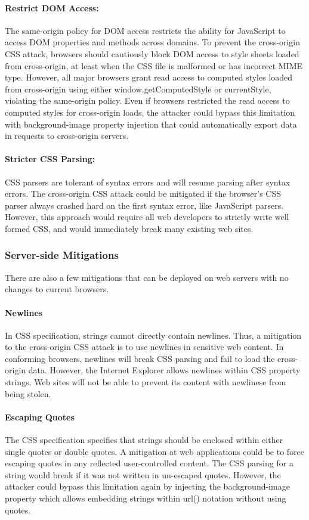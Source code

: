 \documentclass{acm_proc_article-sp}
\begin{document}
{\paragraph{Restrict DOM Access:}
The same-origin policy for DOM access restricts the ability for JavaScript to access DOM properties and methods across domains. To prevent the cross-origin CSS attack, browsers should cautiously block DOM access to style sheets loaded from cross-origin, at least when the CSS file is malformed or has incorrect MIME type. However, all major browsers grant read access to computed styles loaded from cross-origin using either window.getComputedStyle or currentStyle, violating the same-origin policy. Even if browsers restricted the read access to computed styles for cross-origin loads, the attacker could bypass this limitation with background-image property injection that could automatically export data in requests to cross-origin servers.

\paragraph{Stricter CSS Parsing:}
CSS parsers are tolerant of syntax errors and will resume parsing after syntax errors. The cross-origin CSS attack could be mitigated if the browser's CSS parser always crashed hard on the first syntax error, like JavaScript parsers. However, this approach would require all web developers to strictly write well formed CSS, and would immediately break many existing web sites.

\subsubsection{Server-side Mitigations}
There are also a few mitigations that can be deployed on web servers with no changes to current browsers.

\paragraph{Newlines}
In CSS specification, strings cannot directly contain newlines. Thus, a mitigation to the cross-origin CSS attack is to use newlines in sensitive web content. In conforming browsers, newlines will break CSS parsing and fail to load the cross-origin data. However, the Internet Explorer allows newlines within CSS property strings. Web sites will not be able to prevent its content with newlinese from being stolen.

\paragraph{Escaping Quotes}
The CSS specification specifies that strings should be enclosed within either single quotes or double quotes. A mitigation at web applications could be to force escaping quotes in any reflected user-controlled content. The CSS parsing for a string would break if it was not written in un-escaped quotes. However, the attacker could bypass this limitation again by injecting the background-image property which allows embedding strings within url() notation without using quotes.

}
\end{document}
